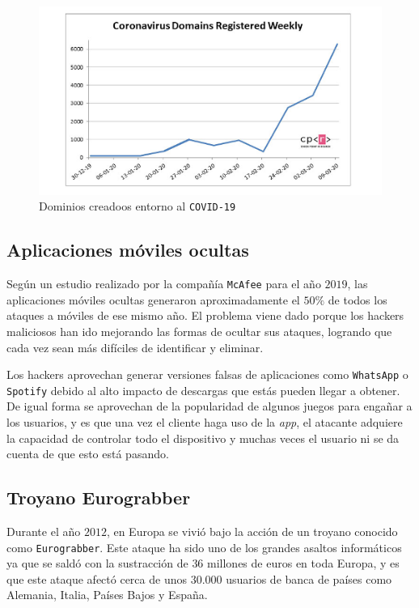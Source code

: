\documentclass[12pt]{article}
\newcommand{\newpar} {
    \vskip 0.5cm
}
\begin{document}
            \begin{figure}
                \centering
                \includegraphics[width=0.5\linewidth]{covid_malware.png}
                \caption{Dominios creadoos entorno al \texttt{COVID-19}}
                \label{f:covid_malware}
            \end{figure}

        \subsection{Aplicaciones móviles ocultas}
            Según un estudio realizado por la compañía \texttt{McAfee} para el año $2019$, las aplicaciones móviles ocultas generaron aproximadamente el $50\%$ de todos los ataques a móviles de ese mismo año. El problema viene dado porque los hackers maliciosos han ido mejorando las formas de ocultar sus ataques, logrando que cada vez sean más difíciles de identificar y eliminar.

            \newpar

            Los hackers aprovechan generar versiones falsas de aplicaciones como \texttt{WhatsApp} o \texttt{Spotify} debido al alto impacto de descargas que estás pueden llegar a obtener. De igual forma se aprovechan de la popularidad de algunos juegos para engañar a los usuarios, y es que una vez el cliente haga uso de la \textit{app}, el atacante adquiere la capacidad de controlar todo el dispositivo y muchas veces el usuario ni se da cuenta de que esto está pasando.

        \subsection{Troyano Eurograbber}
            Durante el año $2012$, en Europa se vivió bajo la acción de un troyano conocido como \texttt{Eurograbber}. Este ataque ha sido uno de los grandes asaltos informáticos ya que se saldó con la sustracción de $36$ millones de euros en toda Europa, y es que este ataque afectó cerca de unos $30.000$ usuarios de banca de países como Alemania, Italia, Países Bajos y España.
\end{document}
